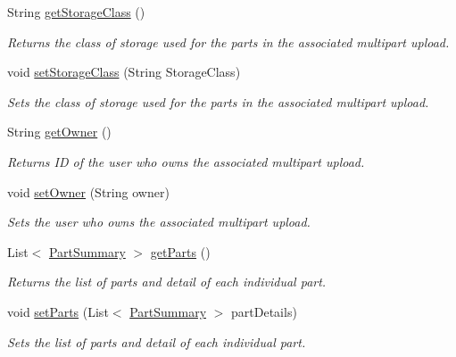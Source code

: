 \begin{DoxyCompactItemize}
String \hyperlink{classorg_1_1jcs_1_1dss_1_1main_1_1PartListing_a0ea8ba9a8ee9e33d9732a794eafa5fee}{get\+Storage\+Class} ()
\begin{DoxyCompactList}\small\item\em Returns the class of storage used for the parts in the associated multipart upload. \end{DoxyCompactList}\item 
void \hyperlink{classorg_1_1jcs_1_1dss_1_1main_1_1PartListing_a0bcf8301a04f33669eb37854144f62d6}{set\+Storage\+Class} (String Storage\+Class)
\begin{DoxyCompactList}\small\item\em Sets the class of storage used for the parts in the associated multipart upload. \end{DoxyCompactList}\item 
String \hyperlink{classorg_1_1jcs_1_1dss_1_1main_1_1PartListing_aadcb729521229949eef55024107d639c}{get\+Owner} ()
\begin{DoxyCompactList}\small\item\em Returns ID of the user who owns the associated multipart upload. \end{DoxyCompactList}\item 
void \hyperlink{classorg_1_1jcs_1_1dss_1_1main_1_1PartListing_a83ed91c8b3c60ebdfb50e41c4050e6ed}{set\+Owner} (String owner)
\begin{DoxyCompactList}\small\item\em Sets the user who owns the associated multipart upload. \end{DoxyCompactList}\item 
List$<$ \hyperlink{classorg_1_1jcs_1_1dss_1_1main_1_1PartSummary}{Part\+Summary} $>$ \hyperlink{classorg_1_1jcs_1_1dss_1_1main_1_1PartListing_a63785d4a86ab3e1289048eeff18cb893}{get\+Parts} ()
\begin{DoxyCompactList}\small\item\em Returns the list of parts and detail of each individual part. \end{DoxyCompactList}\item 
void \hyperlink{classorg_1_1jcs_1_1dss_1_1main_1_1PartListing_a5ccfa5db331858197f7e7d76bdf643e8}{set\+Parts} (List$<$ \hyperlink{classorg_1_1jcs_1_1dss_1_1main_1_1PartSummary}{Part\+Summary} $>$ part\+Details)
\begin{DoxyCompactList}\small\item\em Sets the list of parts and detail of each individual part. \end{DoxyCompactList}\end{DoxyCompactItemize}


